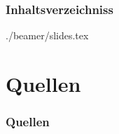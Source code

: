 \documentclass[german]{beamer}
\begin{document}
\title{\workingTitle}

\newcommand{\titleOnPage}[1]{
  \textbf{
  \begin{large}
      #1
    \end{large}
  }
}

\begin{frame}
  \titlepage
\end{frame}

\begin{frame}
  \frametitle{Inhaltsverzeichniss}
  \tableofcontents
\end{frame}

{./beamer/slides.tex}



\section{Quellen}
\begin{frame}
\frametitle{Quellen}  

\printbibliography



\end{frame}
\end{document}
